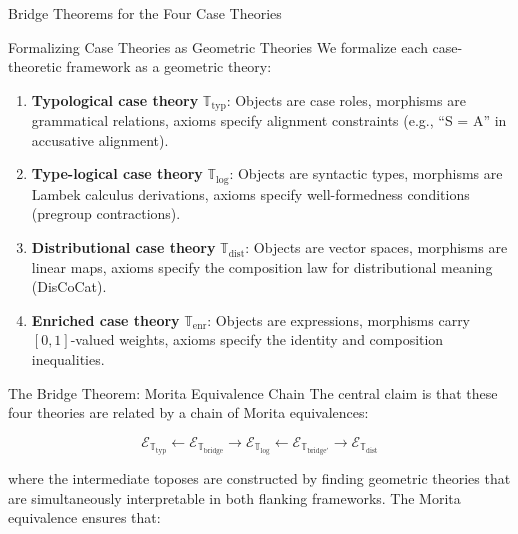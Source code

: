 \documentclass[
  ignorenonframetext,
]{beamer}
\begin{document}
\begin{frame}{Bridge Theorems for the Four Case Theories}
\protect{}\label{bridge-theorems-for-the-four-case-theories}
\begin{block}{Formalizing Case Theories as Geometric Theories}
\protect{}\label{formalizing-case-theories-as-geometric-theories}
We formalize each case-theoretic framework as a geometric theory:

\begin{enumerate}
\item
  \textbf{Typological case theory} \(\mathbb{T}_{\text{typ}}\): Objects
  are case roles, morphisms are grammatical relations, axioms specify
  alignment constraints (e.g., ``S = A'' in accusative alignment).
\item
  \textbf{Type-logical case theory} \(\mathbb{T}_{\text{log}}\): Objects
  are syntactic types, morphisms are Lambek calculus derivations, axioms
  specify well-formedness conditions (pregroup contractions).
\item
  \textbf{Distributional case theory} \(\mathbb{T}_{\text{dist}}\):
  Objects are vector spaces, morphisms are linear maps, axioms specify
  the composition law for distributional meaning (DisCoCat).
\item
  \textbf{Enriched case theory} \(\mathbb{T}_{\text{enr}}\): Objects are
  expressions, morphisms carry \([0,1]\)-valued weights, axioms specify
  the identity and composition inequalities.
\end{enumerate}
\end{block}

\begin{block}{The Bridge Theorem: Morita Equivalence Chain}
\protect{}\label{the-bridge-theorem-morita-equivalence-chain}
The central claim is that these four theories are related by a chain of
Morita equivalences:

\[\mathcal{E}_{\mathbb{T}_{\text{typ}}} \leftarrow \mathcal{E}_{\mathbb{T}_{\text{bridge}}} \rightarrow \mathcal{E}_{\mathbb{T}_{\text{log}}} \leftarrow \mathcal{E}_{\mathbb{T}_{\text{bridge}'}} \rightarrow \mathcal{E}_{\mathbb{T}_{\text{dist}}} \tag{6.1}\]

where the intermediate toposes are constructed by finding geometric
theories that are simultaneously interpretable in both flanking
frameworks. The Morita equivalence ensures that:


\end{block}
\end{frame}
\end{document}
